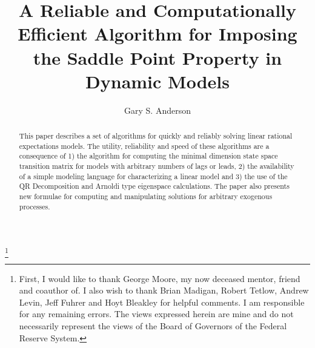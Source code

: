 \documentclass{elsart}
\begin{document}
\initfloatingfigs
%
%

\setlength{\unitlength}{2em}

\begin{frontmatter}
  



\title{ A Reliable and Computationally Efficient Algorithm for 
Imposing the Saddle Point Property in Dynamic Models
}



\author{Gary S. Anderson}
\thanks{First, I would like to thank George Moore, my now deceased mentor,
friend and coauthor of\cite{ANDER:AIM2}.
I also wish to thank Brian Madigan, Robert Tetlow, Andrew Levin,
Jeff Fuhrer and Hoyt Bleakley for helpful comments.
I am responsible for
any remaining errors.
The views expressed herein are mine and 
do not necessarily represent the views of the Board of Governors of the Federal
Reserve System.
}

\begin{abstract}
This paper describes a set of 
algorithms for quickly and reliably solving linear rational expectations 
models.
The utility, reliability and speed of these algorithms are a consequence of
1) the algorithm for computing the minimal dimension state space 
transition matrix for models with arbitrary numbers of  lags or leads,
2) the availability of a simple modeling language for characterizing
a linear model and
3) the use of the QR Decomposition and 
 Arnoldi type eigenspace calculations.
The paper also presents new formulae  for
computing and manipulating solutions for
arbitrary exogenous processes.











\end{abstract}


\end{frontmatter}
\end{document}
